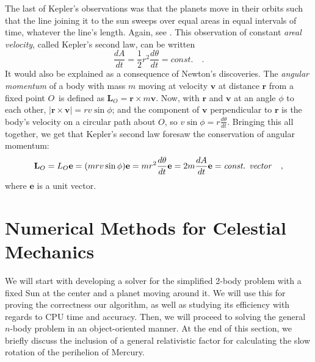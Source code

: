 \documentclass[]{article}
\begin{document}
The last of Kepler's observations was that the planets move in their orbits such that the line joining it to the sun sweeps over equal areas in equal intervals of time, whatever the line's length. Again, see \cite{hibbeler2001}. This observation of constant \textit{areal velocity}, called Kepler's second law, can be written
\begin{equation}
	\frac{dA}{dt} = \frac{1}{2} r^2 \frac{d\theta}{dt} = const. \quad.
\end{equation}
It would also be explained as a consequence of Newton's discoveries. The \textit{angular momentum} of a body with mass $m$ moving at velocity $\mathbf{v}$ at distance $\mathbf{r}$ from a fixed point $O$ is defined as $\mathbf{L}_O = \mathbf{r} \times m\mathbf{v}$. Now, with $\mathbf{r}$ and $\mathbf{v}$ at an angle $\phi$ to each other, $|\mathbf{r} \times \mathbf{v}| = rv \sin \phi$; and the component of $\mathbf{v}$ perpendicular to $\mathbf{r}$ is the body's velocity on a circular path about $O$, so $v \sin \phi = r \frac{d\theta}{dt}$. Bringing this all together, we get that Kepler's second law foresaw the conservation of angular momentum:
\begin{equation}
	\mathbf{L}_O = L_O\mathbf{e} = (mrv \sin \phi )\mathbf{e} = mr^2 \frac{d\theta}{dt} \mathbf{e} = 2m \frac{dA}{dt} \mathbf{e} = \text{\textit{const. vector}} \quad,
\end{equation}
where $\mathbf{e}$ is a unit vector.

\section{Numerical Methods for Celestial Mechanics} \label{methods}

We will start with developing a solver for the simplified 2-body problem with a fixed Sun at the center and a planet moving around it. We will use this for proving the correctness our algorithm, as well as studying its efficiency with regards to CPU time and accuracy. Then, we will proceed to solving the general $n$-body problem in an object-oriented manner. At the end of this section, we briefly discuss the inclusion of a general relativistic factor for calculating the slow rotation of the perihelion of Mercury.
\end{document}
